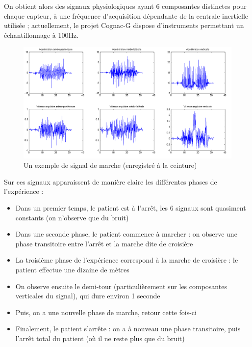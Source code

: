 \documentclass[french,12pt,notitlepage]{report}
\begin{document}
	\vspace{1pc}
	
	On obtient alors des signaux physiologiques ayant 6 composantes distinctes pour chaque capteur, à une fréquence d'acquisition dépendante de la centrale inertielle utilisée ; actuellement, le projet Cognac-G dispose d'instruments permettant un échantillonnage à 100Hz.
	
	\begin{figure}[!h]
		\includegraphics[scale=0.5]{ex_signal_back.png}
		\caption{Un exemple de signal de marche (enregistré à la ceinture)}
		\label{ex_signal_back}
	\end{figure}
	
	Sur ces signaux apparaissent de manière claire les différentes phases de l'expérience :
	\begin{itemize}
		\item Dans un premier temps, le patient est à l'arrêt, les 6 signaux sont quasiment constants (on n'observe que du bruit)
		\item Dans une seconde phase, le patient commence à marcher : on observe une phase transitoire entre l'arrêt et la marche dite de croisière
		\item La troisième phase de l'expérience correspond à la marche de croisière : le patient effectue une dizaine de mètres
		\item On observe ensuite le demi-tour (particulièrement sur les composantes verticales du signal), qui dure environ 1 seconde
		\item Puis, on a une nouvelle phase de marche, retour cette fois-ci
		\item Finalement, le patient s'arrête : on a à nouveau une phase transitoire, puis l'arrêt total du patient (où il ne reste plus que du bruit)
	\end{itemize}
	
\end{document}
